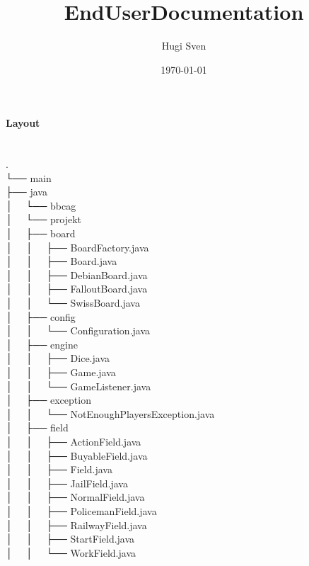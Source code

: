\documentclass[a4paper,12pt]{article}
\begin{document}
	\title{EndUserDocumentation}
	\author{Hugi Sven}
	\date{\today}
	\maketitle
	\paragraph{Layout} \mbox{}\\ %
	.\\
	└── main\\
	├── java\\
	│   └── bbcag\\
	│       └── projekt\\
	│           ├── board\\
	│           │   ├── BoardFactory.java\\
	│           │   ├── Board.java\\
	│           │   ├── DebianBoard.java\\
	│           │   ├── FalloutBoard.java\\
	│           │   └── SwissBoard.java\\
	│           ├── config\\
	│           │   └── Configuration.java\\
	│           ├── engine\\
	│           │   ├── Dice.java\\
	│           │   ├── Game.java\\
	│           │   └── GameListener.java\\
	│           ├── exception\\
	│           │   └── NotEnoughPlayersException.java\\
	│           ├── field\\
	│           │   ├── ActionField.java\\
	│           │   ├── BuyableField.java\\
	│           │   ├── Field.java\\
	│           │   ├── JailField.java\\
	│           │   ├── NormalField.java\\
	│           │   ├── PolicemanField.java\\
	│           │   ├── RailwayField.java\\
	│           │   ├── StartField.java\\
	│           │   └── WorkField.java\\
\end{document}
